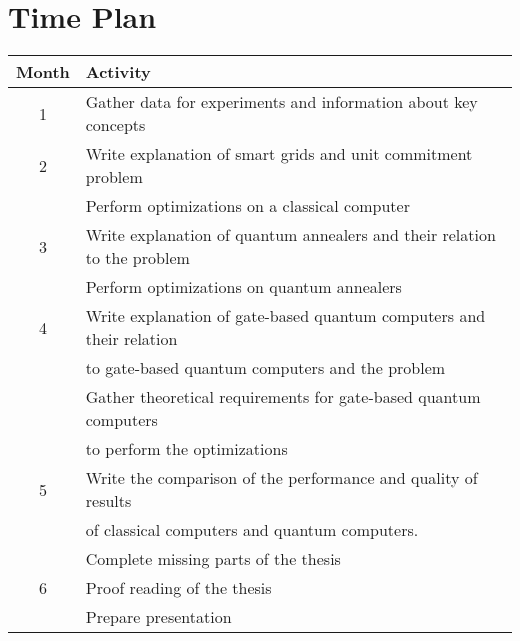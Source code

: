\section{Time Plan}

\begin{table}[h!]
\begin{center}
  \begin{tabular}{|| c | l ||}
    \hline
    Month & Activity \\
    \hline \hline
    1 & Gather data for experiments and information about key concepts \\ \hline
    2 & Write explanation of smart grids and unit commitment problem \\
    & Perform optimizations on a classical computer \\ \hline
    3 & Write explanation of quantum annealers and their relation to the problem \\
    & Perform optimizations on quantum annealers \\ \hline
    4 & Write explanation of gate-based quantum computers and their relation \\
    & to gate-based quantum computers and the problem \\
    & Gather theoretical requirements for gate-based quantum computers \\
    & to perform the optimizations \\ \hline
    5 & Write the comparison of the performance and quality of results \\
    & of classical computers and quantum computers. \\
    & Complete missing parts of the thesis \\ \hline
    6 & Proof reading of the thesis \\
    & Prepare presentation \\ \hline
  \end{tabular}
\end{center}
\end{table}
